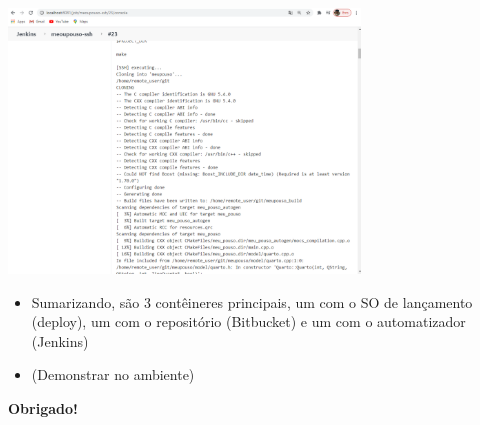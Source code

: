 \documentclass[10pt]{beamer}
\theoremstyle{remark}
\theoremstyle{definition}
\begin{document}
\begin{frame}[allowframebreaks]
	\framebreak
	
	\begin{center}
		\includegraphics[width=0.7\textwidth]{images/36.png}
	\end{center}
	
	\framebreak
	
	\begin{itemize}
		\item Sumarizando, são 3 contêineres principais, um com o SO de lançamento (deploy), um com o repositório (Bitbucket) e um com o automatizador (Jenkins)
		
		\item (Demonstrar no ambiente)
	\end{itemize}
	
	\framebreak
	
	\begin{center}
		\textbf{Obrigado!}
	\end{center}

\end{frame}
\end{document}

